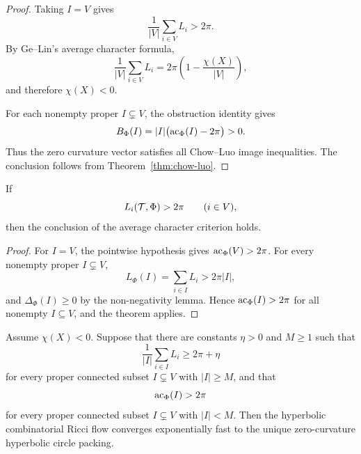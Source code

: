 \begin{proof}
Taking $I=V$ gives
\[
  \frac{1}{|V|}\sum_{i\in V}L_i>2\pi.
\]
By Ge--Lin's average character formula,
\[
  \frac{1}{|V|}\sum_{i\in V}L_i
  =
  2\pi\left(1-\frac{\chi(X)}{|V|}\right),
\]
and therefore $\chi(X)<0$.

For each nonempty proper $I\subsetneq V$, the obstruction identity gives
\[
  B_\Phi(I)=|I|\bigl(\operatorname{ac}_\Phi(I)-2\pi\bigr)>0.
\]
Thus the zero curvature vector satisfies all Chow--Luo image inequalities.
The conclusion follows from Theorem~\ref{thm:chow-luo}.
\end{proof}

\begin{corollary}\label{cor:ge-lin-pointwise}
\leanok
If
\[
  L_i(\mathcal T,\Phi)>2\pi
  \qquad (i\in V),
\]
then the conclusion of the average character criterion holds.
\end{corollary}

\begin{proof}
For $I=V$, the pointwise hypothesis gives $\operatorname{ac}_\Phi(V)>2\pi$.  For every
nonempty proper $I\subsetneq V$,
\[
  L_\Phi(I)=\sum_{i\in I}L_i>2\pi |I|,
\]
and $\Delta_\Phi(I)\ge0$ by the non-negativity lemma.  Hence
$\operatorname{ac}_\Phi(I)>2\pi$ for all nonempty $I\subseteq V$, and the theorem
applies.
\end{proof}

\begin{corollary}\label{cor:lower-average-character-criterion}
\leanok
Assume $\chi(X)<0$.  Suppose that there are constants $\eta>0$ and
$M\ge1$ such that
\[
  \frac{1}{|I|}\sum_{i\in I}L_i\ge2\pi+\eta
\]
for every proper connected subset $I\subsetneq V$ with $|I|\ge M$, and
that
\[
  \operatorname{ac}_\Phi(I)>2\pi
\]
for every proper connected subset $I\subsetneq V$ with $|I|<M$.  Then the
hyperbolic combinatorial Ricci flow converges exponentially fast to the
unique zero-curvature hyperbolic circle packing.
\end{corollary}

